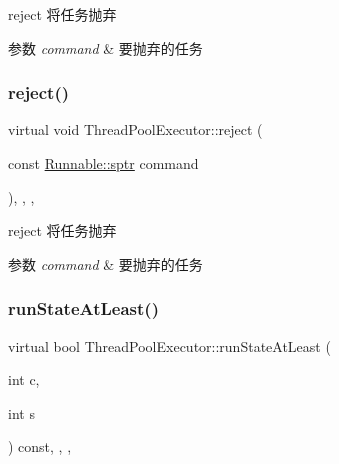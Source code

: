 reject 将任务抛弃 


\begin{DoxyParams}{参数}
{\em command} & 要抛弃的任务 \\
\hline
\end{DoxyParams}
\mbox{\label{classThreadPoolExecutor_a353e65b77bb3c0950ed79939473d4852}} 
\subsubsection{\texorpdfstring{reject()}{reject()}\hspace{0.1cm}{\footnotesize\ttfamily [2/2]}}
{\footnotesize\ttfamily virtual void Thread\+Pool\+Executor\+::reject (\begin{DoxyParamCaption}\item[{const \hyperlink{classRunnable_abe8d3066c7305401d6f0aad8e70780f2}{Runnable\+::sptr}}]{command }\end{DoxyParamCaption})\hspace{0.3cm}{\ttfamily [inline]}, {\ttfamily [final]}, {\ttfamily [protected]}, {\ttfamily [virtual]}}



reject 将任务抛弃 


\begin{DoxyParams}{参数}
{\em command} & 要抛弃的任务 \\
\hline
\end{DoxyParams}
\mbox{\label{classThreadPoolExecutor_a44ee48ed44faa12fc6373074e9059e4e}} 
\subsubsection{\texorpdfstring{run\+State\+At\+Least()}{runStateAtLeast()}}
{\footnotesize\ttfamily virtual bool Thread\+Pool\+Executor\+::run\+State\+At\+Least (\begin{DoxyParamCaption}\item[{int}]{c,  }\item[{int}]{s }\end{DoxyParamCaption}) const\hspace{0.3cm}{\ttfamily [inline]}, {\ttfamily [final]}, {\ttfamily [protected]}, {\ttfamily [virtual]}}



